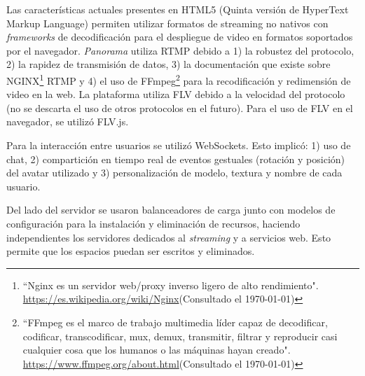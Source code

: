 Las características actuales presentes en HTML5 (Quinta versión de HyperText Markup Language) permiten utilizar formatos de streaming no nativos con \textit{frameworks} de decodificación para el despliegue de video en formatos soportados por el navegador. \textit{Panorama} utiliza RTMP debido a 1) la robustez del protocolo, 2) la rapidez de transmisión de datos, 3) la documentación que existe sobre NGINX\footnote{``Nginx es un servidor web/proxy inverso ligero de alto rendimiento". \url{https://es.wikipedia.org/wiki/Nginx}(Consultado el \today)} RTMP y 4) el uso de FFmpeg\footnote{``FFmpeg es el marco de trabajo multimedia líder capaz de decodificar, codificar, transcodificar, mux, demux, transmitir, filtrar y reproducir casi cualquier cosa que los humanos o las máquinas hayan creado". \url{https://www.ffmpeg.org/about.html}(Consultado el \today)} para la recodificación y redimensión de video en la web. La plataforma utiliza FLV debido a la velocidad del protocolo (no se descarta el uso de otros protocolos en el futuro). Para el uso de FLV en el navegador, se utilizó FLV.js. 

Para la interacción entre usuarios se utilizó WebSockets. Esto implicó: 1) uso de chat, 2) compartición en tiempo real de eventos gestuales (rotación y posición) del avatar utilizado y 3) personalización de modelo, textura y nombre de cada usuario. 

Del lado del servidor  se usaron balanceadores de carga junto con modelos de configuración para la instalación y eliminación de recursos, haciendo independientes los servidores dedicados al \textit{streaming} y a servicios web. Esto permite que los espacios puedan ser escritos y eliminados.
